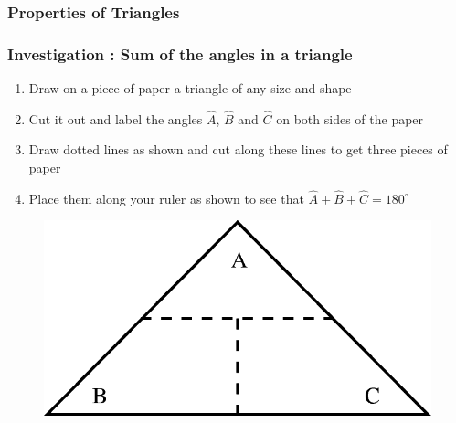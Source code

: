             \subsubsection{ Properties of Triangles}
            \nopagebreak
\label{m39368*secfhsst!!!underscore!!!id655}
            \subsubsection{  Investigation : Sum of the angles in a triangle }
            \nopagebreak
          \label{m39368*id317720}\begin{enumerate}[noitemsep, label=\textbf{\arabic*}. ] 
            \label{m39368*uid41}\item Draw on a piece of paper a triangle of any size and shape
\label{m39368*uid42}\item Cut it out and label the angles \begin{math}\hat{A}\end{math}, \begin{math}\hat{B}\end{math} and \begin{math}\hat{C}\end{math} on both sides of the paper
\label{m39368*uid43}\item Draw dotted lines as shown and cut along these lines to get three pieces of paper
\label{m39368*uid44}\item Place them along your ruler as shown to see that \begin{math}\hat{A}+\hat{B}+\hat{C}={180}^{\circ }\end{math}\end{enumerate}
          \label{m39368*id317868}
    \setcounter{subfigure}{0}
	\begin{figure}[H] %
    \begin{center}
    \label{m39368*id317874!!!underscore!!!media}\label{m39368*id317874!!!underscore!!!printimage}\includegraphics{col11306.imgs/m39368_MG10C13_027.png} %
      \vspace{2pt}
    \vspace{.1in}
    \end{center}
 \end{figure}       
